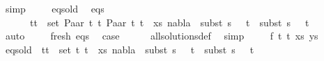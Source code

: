 \begin{isabellebody}
\ simp\isanewline
\ \ \ \isamarkupfalse%
\ eqs{\isacharunderscore}{\kern0pt}old\ \isamarkupfalse%
\ eqs{\isacharcolon}{\kern0pt}\isanewline
\ \ \ \ \ {\isachardoublequoteopen}{\isasymforall}\ {\isacharparenleft}{\kern0pt}t{}{\isacharcomma}{\kern0pt}t{}{\isacharparenright}{\kern0pt}\ {\isasymin}\ set\ {\isacharparenleft}{\kern0pt}{\isacharparenleft}{\kern0pt}Paar\ t{}\ t{}{\isacharcomma}{\kern0pt}\ Paar\ t{}\ t{}{\isacharparenright}{\kern0pt}\ {\isacharhash}{\kern0pt}\ xs{\isacharparenright}{\kern0pt}{\isachardot}{\kern0pt}\ nabla{}\ {\isasymturnstile}\ subst\ {\isacharparenleft}{\kern0pt}s{}\ {\isasymbullet}\ {\isacharbrackleft}{\kern0pt}{\isacharbrackright}{\kern0pt}{\isacharparenright}{\kern0pt}\ t{}\ {\isasymapprox}\ subst\ {\isacharparenleft}{\kern0pt}s{}\ {\isasymbullet}\ {\isacharbrackleft}{\kern0pt}{\isacharbrackright}{\kern0pt}{\isacharparenright}{\kern0pt}\ t{}{\isachardoublequoteclose}\isanewline
\ \ \ \ \ \isamarkupfalse%
\ auto\isanewline
\ \ \ \isamarkupfalse%
\ fresh\ eqs\ \isamarkupfalse%
\ {\isacharquery}{\kern0pt}case\isanewline
\ \ \ \ \isamarkupfalse%
\ all{\isacharunderscore}{\kern0pt}solutions{\isacharunderscore}{\kern0pt}def\ \isamarkupfalse%
\ simp\isanewline
{}\isamarkupfalse%
\isanewline
\ \ \isamarkupfalse%
\ {\isacharparenleft}{\kern0pt}{}\ f\ t{}\ t{}\ xs\ ys{\isacharparenright}{\kern0pt}\isanewline
\ \ \isamarkupfalse%
\ eqs{\isacharunderscore}{\kern0pt}old{\isacharcolon}{\kern0pt}\ {\isachardoublequoteopen}{\isasymforall}\ {\isacharparenleft}{\kern0pt}t{}{\isacharcomma}{\kern0pt}t{}{\isacharparenright}{\kern0pt}\ {\isasymin}\ set\ {\isacharparenleft}{\kern0pt}{\isacharparenleft}{\kern0pt}t{}{\isacharcomma}{\kern0pt}\ t{}{\isacharparenright}{\kern0pt}\ {\isacharhash}{\kern0pt}\ xs{\isacharparenright}{\kern0pt}{\isachardot}{\kern0pt}\ nabla{}\ {\isasymturnstile}\ subst\ {\isacharparenleft}{\kern0pt}s{}\ {\isasymbullet}\ {\isacharbrackleft}{\kern0pt}{\isacharbrackright}{\kern0pt}{\isacharparenright}{\kern0pt}\ t{}\ {\isasymapprox}\ subst\ {\isacharparenleft}{\kern0pt}s{}\ {\isasymbullet}\ {\isacharbrackleft}{\kern0pt}{\isacharbrackright}{\kern0pt}{\isacharparenright}{\kern0pt}\ t{}{\isachardoublequoteclose}\ \isanewline

\end{isabellebody}
